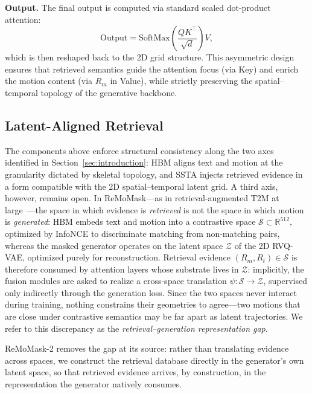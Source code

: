\documentclass[10pt,journal,compsoc]{IEEEtran}
\newcommand{\myparagraph}[1]{\textbf{#1}\hspace{1.8ex}}
\begin{document}
\noindent \myparagraph{Output.}
The final output is computed via standard scaled dot-product attention:
\begin{equation}
\mathrm{Output}
=
\mathrm{SoftMax}
\left(
    \frac{QK^\top}{\sqrt{d}}
\right)V,
\end{equation}
which is then reshaped back to the 2D grid structure. This asymmetric design ensures that retrieved semantics guide the attention focus (via Key) and enrich the motion content (via $R_m$ in Value), while strictly preserving the spatial–temporal topology of the generative backbone.


\subsection{Latent-Aligned Retrieval}
\label{subsec:lar}

The components above enforce structural consistency along the two axes identified in Section~\ref{sec:introduction}: HBM aligns text and motion at the granularity dictated by skeletal topology, and SSTA injects retrieved evidence in a form compatible with the 2D spatial--temporal latent grid. A third axis, however, remains open. In ReMoMask---as in retrieval-augmented T2M at large~\cite{remodiffuse,remogpt,morag}---the space in which evidence is \emph{retrieved} is not the space in which motion is \emph{generated}: HBM embeds text and motion into a contrastive space $\mathcal{S} \subset \mathbb{R}^{512}$, optimized by InfoNCE to discriminate matching from non-matching pairs, whereas the masked generator operates on the latent space $\mathcal{Z}$ of the 2D RVQ-VAE, optimized purely for reconstruction. Retrieval evidence $(R_m, R_t) \in \mathcal{S}$ is therefore consumed by attention layers whose substrate lives in $\mathcal{Z}$: implicitly, the fusion modules are asked to realize a cross-space translation $\psi: \mathcal{S} \rightarrow \mathcal{Z}$, supervised only indirectly through the generation loss. Since the two spaces never interact during training, nothing constrains their geometries to agree---two motions that are close under contrastive semantics may be far apart as latent trajectories. We refer to this discrepancy as the \emph{retrieval--generation representation gap}.

ReMoMask-2 removes the gap at its source: rather than translating evidence across spaces, we construct the retrieval database directly in the generator's own latent space, so that retrieved evidence arrives, by construction, in the representation the generator natively consumes.
\end{document}

